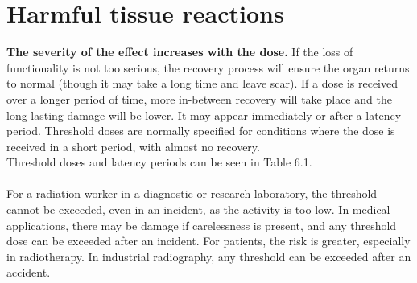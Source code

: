 \section{Harmful tissue reactions}
\textbf{The severity of the effect increases with the dose.} If the loss of functionality is not too serious, the recovery process will ensure the organ returns to normal (though it may take a long time and leave scar). If a dose is received over a longer period of time, more in-between recovery will take place and the long-lasting damage will be lower. It may appear immediately or after a latency period. Threshold doses are normally specified for conditions where the dose is received in a short period, with almost no recovery. \\
Threshold doses and latency periods can be seen in Table 6.1.\\\\
For a radiation worker in a diagnostic or research laboratory, the threshold cannot be exceeded, even in an incident, as the activity is too low. In medical applications, there may be damage if carelessness is present, and any threshold dose can be exceeded after an incident. For patients, the risk is greater, especially in radiotherapy. In industrial radiography, any threshold can be exceeded after an accident.
